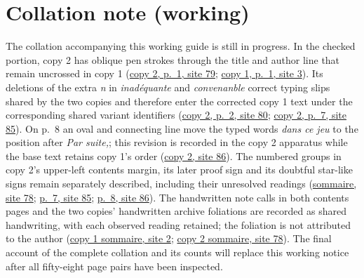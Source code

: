 \documentclass[11pt,a4paper]{article}
\begin{document}
\section*{Collation note (working)}
The collation accompanying this working guide is still in progress. In the checked portion, copy 2 has oblique pen strokes through the title and author line that remain uncrossed in copy 1 (\href{https://grothendieck.umontpellier.fr/web/viewer.html?file=../119.pdf\#page=80}{copy 2, p.~1, site 79}; \href{https://grothendieck.umontpellier.fr/web/viewer.html?file=../119.pdf\#page=4}{copy 1, p.~1, site 3}). Its deletions of the extra \textit{n} in \textit{inadéquante} and \textit{convenanble} correct typing slips shared by the two copies and therefore enter the corrected copy 1 text under the corresponding shared variant identifiers (\href{https://grothendieck.umontpellier.fr/web/viewer.html?file=../119.pdf\#page=81}{copy 2, p.~2, site 80}; \href{https://grothendieck.umontpellier.fr/web/viewer.html?file=../119.pdf\#page=86}{copy 2, p.~7, site 85}). On p.~8 an oval and connecting line move the typed words \textit{dans ce jeu} to the position after \textit{Par suite,}; this revision is recorded in the copy 2 apparatus while the base text retains copy 1's order (\href{https://grothendieck.umontpellier.fr/web/viewer.html?file=../119.pdf\#page=87}{copy 2, site 86}). The numbered groups in copy 2's upper-left contents margin, its later proof sign and its doubtful star-like signs remain separately described, including their unresolved readings (\href{https://grothendieck.umontpellier.fr/web/viewer.html?file=../119.pdf\#page=79}{sommaire, site 78}; \href{https://grothendieck.umontpellier.fr/web/viewer.html?file=../119.pdf\#page=86}{p.~7, site 85}; \href{https://grothendieck.umontpellier.fr/web/viewer.html?file=../119.pdf\#page=87}{p.~8, site 86}). The handwritten note calls in both contents pages and the two copies' handwritten archive foliations are recorded as shared handwriting, with each observed reading retained; the foliation is not attributed to the author (\href{https://grothendieck.umontpellier.fr/web/viewer.html?file=../119.pdf\#page=3}{copy 1 sommaire, site 2}; \href{https://grothendieck.umontpellier.fr/web/viewer.html?file=../119.pdf\#page=79}{copy 2 sommaire, site 78}). The final account of the complete collation and its counts will replace this working notice after all fifty-eight page pairs have been inspected.
\end{document}
